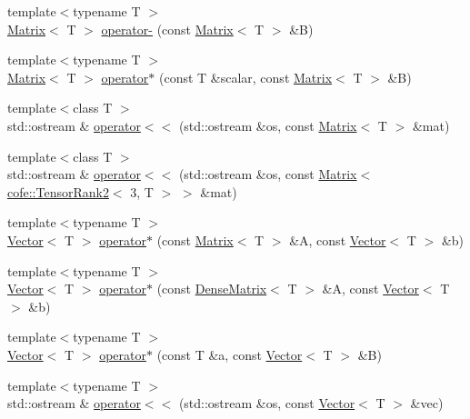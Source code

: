 \begin{DoxyCompactItemize}
\item 
{\footnotesize template$<$typename T $>$ }\\\hyperlink{classlmx_1_1Matrix}{Matrix}$<$ T $>$ \hyperlink{namespacelmx_a12fd7ce454c4b736867bcebc9f7ac84c}{operator-\/} (const \hyperlink{classlmx_1_1Matrix}{Matrix}$<$ T $>$ \&B)
\item 
{\footnotesize template$<$typename T $>$ }\\\hyperlink{classlmx_1_1Matrix}{Matrix}$<$ T $>$ \hyperlink{namespacelmx_ad723ad98140948b6fc56bf5d0193c1a1}{operator$\ast$} (const T \&scalar, const \hyperlink{classlmx_1_1Matrix}{Matrix}$<$ T $>$ \&B)
\item 
{\footnotesize template$<$class T $>$ }\\std\-::ostream \& \hyperlink{namespacelmx_a4593e2a6c2c72cba0b1c556c0f306b3c}{operator$<$$<$} (std\-::ostream \&os, const \hyperlink{classlmx_1_1Matrix}{Matrix}$<$ T $>$ \&mat)
\item 
{\footnotesize template$<$class T $>$ }\\std\-::ostream \& \hyperlink{namespacelmx_ac08b14163726a57e0acae786c74bc6ee}{operator$<$$<$} (std\-::ostream \&os, const \hyperlink{classlmx_1_1Matrix}{Matrix}$<$ \hyperlink{classcofe_1_1TensorRank2}{cofe\-::\-Tensor\-Rank2}$<$ 3, T $>$ $>$ \&mat)
\item 
{\footnotesize template$<$typename T $>$ }\\\hyperlink{classlmx_1_1Vector}{Vector}$<$ T $>$ \hyperlink{namespacelmx_a056662a18d83b06f907bd389b7001b35}{operator$\ast$} (const \hyperlink{classlmx_1_1Matrix}{Matrix}$<$ T $>$ \&A, const \hyperlink{classlmx_1_1Vector}{Vector}$<$ T $>$ \&b)
\item 
{\footnotesize template$<$typename T $>$ }\\\hyperlink{classlmx_1_1Vector}{Vector}$<$ T $>$ \hyperlink{namespacelmx_a77129091804126ffb475a3e086be8612}{operator$\ast$} (const \hyperlink{classlmx_1_1DenseMatrix}{Dense\-Matrix}$<$ T $>$ \&A, const \hyperlink{classlmx_1_1Vector}{Vector}$<$ T $>$ \&b)
\item 
{\footnotesize template$<$typename T $>$ }\\\hyperlink{classlmx_1_1Vector}{Vector}$<$ T $>$ \hyperlink{namespacelmx_aa216d870ef9e604a7ef9bd3266e148f0}{operator$\ast$} (const T \&a, const \hyperlink{classlmx_1_1Vector}{Vector}$<$ T $>$ \&B)
\item 
{\footnotesize template$<$typename T $>$ }\\std\-::ostream \& \hyperlink{namespacelmx_a9a344d9925b2c2536ad9a92115170e0f}{operator$<$$<$} (std\-::ostream \&os, const \hyperlink{classlmx_1_1Vector}{Vector}$<$ T $>$ \&vec)
\end{DoxyCompactItemize}
